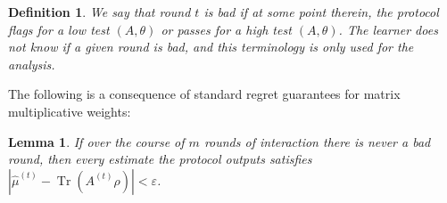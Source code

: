\documentclass[10pt]{article}
\renewcommand{\epsilon}{\varepsilon}
\DeclareMathOperator{\Tr}{Tr}
\newcommand{\Id}{\mathbbm{1}}
\newtheorem{lemma}[theorem]{Lemma}
\newtheorem{definition}[theorem]{Definition}
\newcommand{\lift}[1]{\overline{#1}}
\begin{document}


\begin{definition}
    We say that round $t$ is \emph{bad} if at some point therein, the protocol flags for a low test $(A,\theta)$ or passes for a high test $(A,\theta)$. The learner does not know if a given round is bad, and this terminology is only used for the analysis.
\end{definition}

\noindent The following is a consequence of standard regret guarantees for matrix multiplicative weights:

\begin{lemma}\label{lem:mmw}
    If over the course of $m$ rounds of interaction there is never a bad round, then every estimate the protocol outputs satisfies $|\widehat{\mu}^{(t)} - \Tr(A^{(t)}\rho)| < \epsilon$.
\end{lemma}
\end{document}
